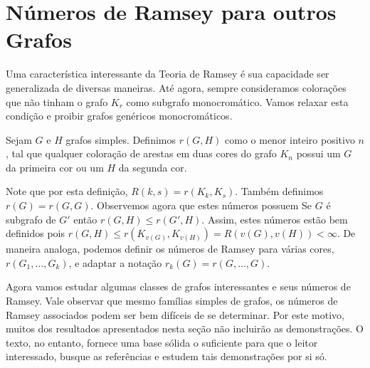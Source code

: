 
\chapter{Números de Ramsey para outros Grafos}
\label{chap:graph}


Uma característica interessante da Teoria de Ramsey é sua capacidade ser generalizada de diversas maneiras. Até agora, sempre consideramos colorações que não tinham o grafo $K_r$ como subgrafo monocromático. Vamos relaxar esta condição e proibir grafos genéricos monocromáticos.

\begin{definition}
Sejam $G$ e $H$ grafos simples. Definimos $r(G,H)$ como o menor inteiro positivo $n$, tal que qualquer coloração de arestas em duas cores do grafo $K_n$ possui um $G$ da primeira cor ou um $H$ da segunda cor.
\end{definition}

Note que por esta definição, $R(k,s) = r(K_k, K_s)$. Também definimos $r(G) = r(G,G)$. Observemos agora que estes números possuem
Se $G$ é subgrafo de $G'$ então $r(G,H) \leq r(G',H)$. Assim, estes números estão bem definidos pois $r(G,H) \leq r(K_{v(G)}, K_{v(H)}) = R(v(G), v(H)) < \infty$. De maneira analoga, podemos definir os números de Ramsey para várias cores, $r(G_1, \dots, G_k)$, e adaptar a notação $r_k(G) = r(G,\dots,G)$.

Agora vamos estudar algumas classes de grafos interessantes e seus números de Ramsey. Vale observar que mesmo famílias simples de grafos, os números de Ramsey associados podem ser bem difíceis de se determinar. Por este motivo, muitos dos resultados apresentados nesta seção não incluirão as demonstrações. O texto, no entanto, fornece uma base sólida o suficiente para que o leitor interessado, busque as referências e estudem tais demonstrações por si só.


